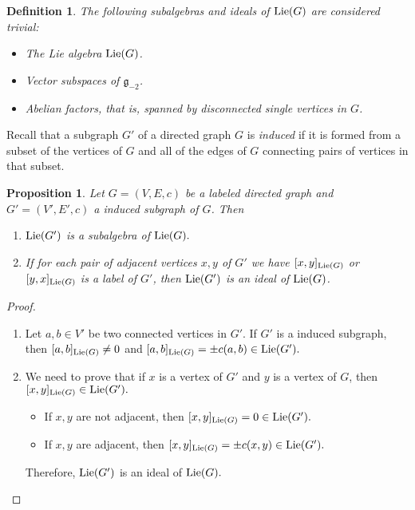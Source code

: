 \documentclass[12pt]{amsart}
\newtheorem{defn}[teo]{Definition}
\newtheorem{proposition}[teo]{Proposition}
\begin{document}
\begin{defn}
The following subalgebras and ideals of ${\rm Lie}(G)$ are considered {\em trivial}:
\begin{itemize}
\item The Lie algebra ${\rm Lie}(G)$.
\item Vector subspaces of $\mathfrak{g}_{-2}$.
\item Abelian factors, that is, spanned by disconnected single vertices in $G$.
\end{itemize}
\end{defn}

Recall that a subgraph $G'$ of a directed graph $G$ is {\em induced} if it is formed from a subset of the vertices of $G$ and all of the edges of $G$ connecting pairs of vertices in that subset.

%

\begin{proposition}\label{ideals}
Let $G=(V,E,c)$ be a labeled directed graph and $G'=(V',E',c)$ a induced subgraph of $G$. Then

\begin{enumerate}
	\item ${\rm Lie}(G')$ is a subalgebra of ${\rm Lie}(G).$
	
	\item If for each pair of adjacent vertices $x,y$ of $G'$ we have $[x,y]_{{\rm Lie}(G)}$ or $[y,x]_{{\rm Lie}(G)}$ is a label of $G'$, then  ${\rm Lie}(G')$ is an ideal of ${\rm Lie}(G)$.
\end{enumerate}
\end{proposition}
\begin{proof}
\begin{enumerate}
\item Let $a,b\in V'$ be two connected vertices in $G'$. If $G'$ is a induced subgraph, then $[a,b]_{{\rm Lie}(G)}\neq 0$ and $[a,b]_{{\rm Lie}(G)}=\pm c(a,b)\in {\rm Lie}(G').$	
\item We need to prove that if $x$ is a vertex of $G'$ and $y$ is a vertex of $G$, then $[x,y]_{{\rm Lie}(G)}\in {\rm Lie}(G').$

\begin{itemize}
	\item If $x,y$ are not adjacent, then $[x,y]_{{\rm Lie}(G)}=0\in {\rm Lie}(G').$
	\item If $x,y$ are adjacent, then $[x,y]_{{\rm Lie}(G)}=\pm c(x,y)\in {\rm Lie}(G').$
\end{itemize}
Therefore, ${\rm Lie}(G')$ is an ideal of ${\rm Lie}(G).$\qedhere
\end{enumerate}		

\end{proof}
\end{document}
